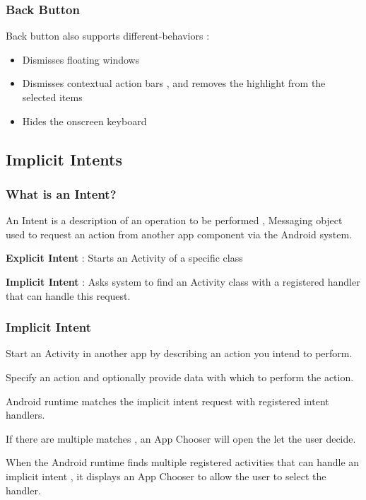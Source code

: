 \documentclass{article}
\begin{document}
\subsubsection{Back Button}

Back button also supports different-behaviors :

\begin{itemize}
    \item Dismisses floating windows
    \item Dismisses contextual action bars , and removes the highlight from the selected items
    \item Hides the onscreen keyboard
\end{itemize}

\subsection{Implicit Intents}

\subsubsection{What is an Intent?}

An Intent is a description of an operation to be performed , Messaging object used to request an action from another app component via the Android system.

\textbf{Explicit Intent} : Starts an Activity of a specific class

\textbf{Implicit Intent} : Asks system to find an Activity class with a registered handler that can handle this request.


\subsubsection{Implicit Intent}

Start an Activity in another app by describing an action you intend to perform.

Specify an action and optionally provide data with which to perform the action.

Android runtime matches the implicit intent request with registered intent handlers.

If there are multiple matches , an App Chooser will open the let the user decide.

When the Android runtime finds multiple registered activities that can handle an implicit intent , it displays an App Chooser to allow the user to select the handler.
\end{document}
